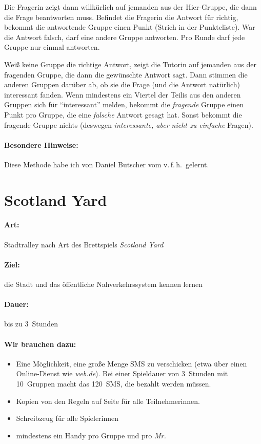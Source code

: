 Die Fragerin zeigt dann willkürlich auf jemanden aus der Hier-Gruppe, die dann die Frage beantworten muss. Befindet die Fragerin die Antwort für richtig, bekommt die antwortende Gruppe einen Punkt (Strich in der Punkteliste). War die Antwort falsch, darf eine andere Gruppe antworten. Pro Runde darf jede Gruppe nur einmal antworten.

Weiß keine Gruppe die richtige Antwort, zeigt die Tutorin auf jemanden aus der fragenden Gruppe, die dann die gewünschte Antwort sagt. Dann stimmen die anderen Gruppen darüber ab, ob sie die Frage (und die Antwort natürlich) interessant fanden. Wenn mindestens ein Viertel der Teilis aus den anderen Gruppen sich für "`interessant"' melden, bekommt die \emph{fragende} Gruppe einen Punkt pro Gruppe, die eine \emph{falsche} Antwort gesagt hat. Sonst bekommt die fragende Gruppe nichts (deswegen \emph{interessante, aber nicht zu einfache} Fragen).
\paragraph{Besondere Hinweise:} Diese Methode habe ich von Daniel Butscher vom v.\,f.\,h.~gelernt.

\section{Scotland Yard}
\paragraph{Art:} Stadtralley nach Art des Brettspiels \emph{Scotland Yard}
\paragraph{Ziel:} die Stadt und das öffentliche Nahverkehrssystem kennen lernen
\paragraph{Dauer:} bis zu 3~Stunden
\paragraph{Wir brauchen dazu:}
\begin{itemize}
	\item Eine Möglichkeit, eine große Menge SMS zu verschicken (etwa über einen Online-Dienst wie \emph{web.de}). Bei einer Spieldauer von 3~Stunden mit 10~Gruppen macht das 120~SMS, die bezahlt werden müssen.
    \item Kopien von den Regeln auf Seite \pageref{scotland-yard-regeln} für alle Teilnehmerinnen.
	\item Schreibzeug für alle Spielerinnen
	\item mindestens ein Handy pro Gruppe und pro \emph{Mr.}
\end{itemize}

